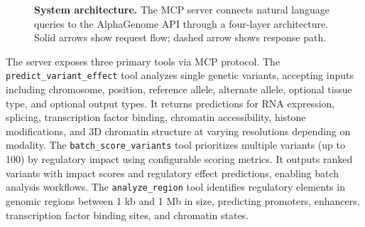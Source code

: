 \documentclass[11pt]{article}
\begin{document}
\begin{figure}[t]
\centering
{}
\caption{\textbf{System architecture.} The MCP server connects natural language queries to the AlphaGenome API through a four-layer architecture. Solid arrows show request flow; dashed arrow shows response path.}
\label{fig:architecture}
\end{figure}

The server exposes three primary tools via MCP protocol. The \texttt{predict\_variant\_effect} tool analyzes single genetic variants, accepting inputs including chromosome, position, reference allele, alternate allele, optional tissue type, and optional output types. It returns predictions for RNA expression, splicing, transcription factor binding, chromatin accessibility, histone modifications, and 3D chromatin structure at varying resolutions depending on modality. The \texttt{batch\_score\_variants} tool prioritizes multiple variants (up to 100) by regulatory impact using configurable scoring metrics. It outputs ranked variants with impact scores and regulatory effect predictions, enabling batch analysis workflows. The \texttt{analyze\_region} tool identifies regulatory elements in genomic regions between 1 kb and 1 Mb in size, predicting promoters, enhancers, transcription factor binding sites, and chromatin states.
\end{document}
